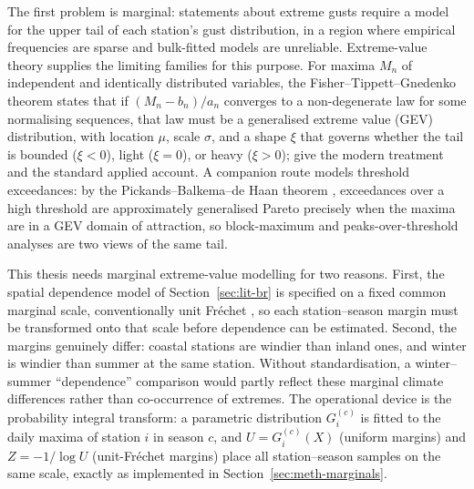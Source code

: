 The first problem is marginal: statements about extreme gusts require a model for the upper tail of each station's gust distribution, in a region where empirical frequencies are sparse and bulk-fitted models are unreliable. Extreme-value theory supplies the limiting families for this purpose. For maxima \(M_n\) of independent and identically distributed variables, the Fisher--Tippett--Gnedenko theorem \citep{fisher1928,gnedenko1943} states that if \((M_n-b_n)/a_n\) converges to a non-degenerate law for some normalising sequences, that law must be a generalised extreme value (GEV) distribution, with location \(\mu\), scale \(\sigma\), and a shape \(\xi\) that governs whether the tail is bounded (\(\xi<0\)), light (\(\xi=0\)), or heavy (\(\xi>0\)); \citet{dehaan2006} give the modern treatment and \citet{coles2001} the standard applied account. A companion route models threshold exceedances: by the Pickands--Balkema--de Haan theorem \citep{pickands1975,balkema1974}, exceedances over a high threshold are approximately generalised Pareto precisely when the maxima are in a GEV domain of attraction, so block-maximum and peaks-over-threshold analyses are two views of the same tail.

This thesis needs marginal extreme-value modelling for two reasons. First, the spatial dependence model of Section~\ref{sec:lit-br} is specified on a fixed common marginal scale, conventionally unit Fr\'echet \citep{dehaan2006}, so each station--season margin must be transformed onto that scale before dependence can be estimated. Second, the margins genuinely differ: coastal stations are windier than inland ones, and winter is windier than summer at the same station. Without standardisation, a winter--summer ``dependence'' comparison would partly reflect these marginal climate differences rather than co-occurrence of extremes. The operational device is the probability integral transform: a parametric distribution \(G_i^{(c)}\) is fitted to the daily maxima of station \(i\) in season \(c\), and \(U=G_i^{(c)}(X)\) (uniform margins) and \(Z=-1/\log U\) (unit-Fr\'echet margins) place all station--season samples on the same scale, exactly as implemented in Section~\ref{sec:meth-marginals}.

